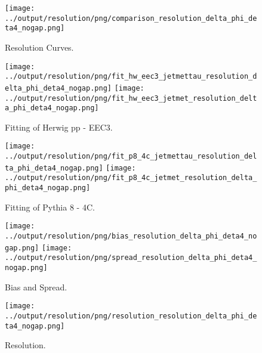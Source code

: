 \documentclass[11pt]{book}
\begin{document}
\begin{figure}[ht]
\centering
\texttt{[image: ../output/resolution/png/comparison\_resolution\_delta\_phi\_deta4\_nogap.png]}
\caption{Resolution Curves.}
\end{figure}


\begin{figure}[ht]
\centering
\texttt{[image: ../output/resolution/png/fit\_hw\_eec3\_jetmettau\_resolution\_delta\_phi\_deta4\_nogap.png]}
\texttt{[image: ../output/resolution/png/fit\_hw\_eec3\_jetmet\_resolution\_delta\_phi\_deta4\_nogap.png]}
\caption{Fitting of Herwig pp - EEC3.}
\end{figure}

\begin{figure}[ht]
\centering
\texttt{[image: ../output/resolution/png/fit\_p8\_4c\_jetmettau\_resolution\_delta\_phi\_deta4\_nogap.png]}
\texttt{[image: ../output/resolution/png/fit\_p8\_4c\_jetmet\_resolution\_delta\_phi\_deta4\_nogap.png]}
\caption{Fitting of Pythia 8 - 4C.}
\end{figure}

\begin{figure}[ht]
\centering
\texttt{[image: ../output/resolution/png/bias\_resolution\_delta\_phi\_deta4\_nogap.png]}
\texttt{[image: ../output/resolution/png/spread\_resolution\_delta\_phi\_deta4\_nogap.png]}
\caption{Bias and Spread.}
\end{figure}


\begin{figure}[ht]
\centering
\texttt{[image: ../output/resolution/png/resolution\_resolution\_delta\_phi\_deta4\_nogap.png]}
\caption{Resolution.}
\end{figure}
\clearpage

 
\end{document}
